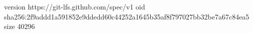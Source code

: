 version https://git-lfs.github.com/spec/v1
oid sha256:2f9addd1a591852e9ddedd60c44252a1645b35af8f797027bb32be7a67c84ea5
size 40296

